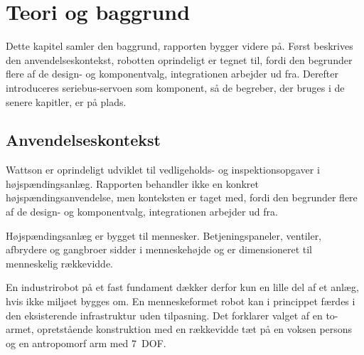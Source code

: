 \chapter{Teori og baggrund}
\label{ch:teori}

\titleformat{\paragraph}[block]
  {\normalfont\bfseries}{}{0pt}{}
\titlespacing*{\paragraph}{0pt}{1.2em}{0.3em}


Dette kapitel samler den baggrund, rapporten bygger videre på.
Først beskrives den anvendelseskontekst, robotten oprindeligt er
tegnet til, fordi den begrunder flere af de design- og
komponentvalg, integrationen arbejder ud fra. Derefter
introduceres seriebus-servoen som komponent, så de begreber, der
bruges i de senere kapitler, er på plads.

\section{Anvendelseskontekst}
\label{sec:anvendelseskontekst}

Wattson er oprindeligt udviklet til vedligeholds- og
inspektionsopgaver i højspændingsanlæg. Rapporten behandler ikke en
konkret højspændingsanvendelse, men konteksten er taget med, fordi
den begrunder flere af de design- og komponentvalg, integrationen
arbejder ud fra.

Højspændingsanlæg er bygget til mennesker. Betjeningspaneler,
ventiler, afbrydere og gangbroer sidder i menneskehøjde og er
dimensioneret til menneskelig rækkevidde.

En industrirobot på et fast fundament dækker derfor kun en
lille del af et anlæg, hvis ikke miljøet bygges om. En
menneskeformet robot kan i princippet færdes i den eksisterende
infrastruktur uden tilpasning. Det forklarer valget af en to-armet,
opretstående konstruktion med en rækkevidde tæt på en voksen
persons og en antropomorf arm med 7~DOF.

